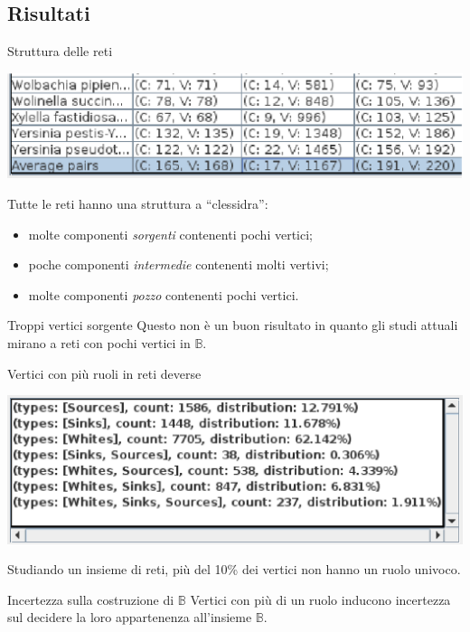 \documentclass{beamer}
\begin{document}
\subsection{Risultati}

\begin{frame}{Struttura delle reti}
  \begin{center}
    \includegraphics[scale=.5]{images/ResultViewer-table-with-average-row-selected-particular.eps}
  \end{center}
Tutte le reti hanno una struttura a ``clessidra'':
\begin{itemize}
\item molte componenti \emph{sorgenti} contenenti pochi vertici;
\item poche componenti \emph{intermedie} contenenti molti vertivi;
\item molte componenti \emph{pozzo} contenenti pochi vertici.
\end{itemize}
\pause
\begin{alertblock}{Troppi vertici sorgente}
  Questo non \`e un buon risultato in quanto gli studi attuali mirano
  a reti con pochi vertici in $\mathbb{B}$.
\end{alertblock}
\end{frame}

\begin{frame}{Vertici con pi\`u ruoli in reti deverse}
  \begin{center}
    \includegraphics[scale=.5]{images/ResultViewer-grouping-table-zoom}
  \end{center}
  Studiando un insieme di reti, pi\`u del 10\% dei vertici non hanno
  un ruolo univoco.
  \pause
  \begin{alertblock}{Incertezza sulla costruzione di $\mathbb{B}$}
    Vertici con pi\`u di un ruolo inducono incertezza sul decidere la
    loro appartenenza all'insieme $\mathbb{B}$.
  \end{alertblock}
\end{frame}
\end{document}

